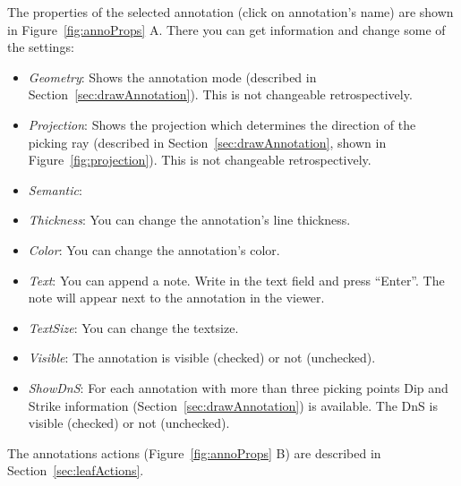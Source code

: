 The properties of the selected annotation (click on annotation's name) are shown in Figure~\ref{fig:annoProps} A. There you can get information and change some of the settings:
\begin{itemize}
	\item \textit{Geometry}: Shows the annotation mode (described in Section~\ref{sec:drawAnnotation}). This is not changeable retrospectively.
	\item \textit{Projection}: Shows the projection which determines the direction of the picking ray (described in Section~\ref{sec:drawAnnotation}, shown in Figure~\ref{fig:projection}). This is not changeable retrospectively.
	\item \textit{Semantic}: 
	\item \textit{Thickness}: You can change the annotation's line thickness.
	\item \textit{Color}: You can change the annotation's color.
	\item \textit{Text}: You can append a note. Write in the text field and press ``Enter''. The note will appear next to the annotation in the viewer. 
	\item \textit{TextSize}: You can change the textsize.
	\item \textit{Visible}: The annotation is visible (checked) or not (unchecked).
	\item \textit{ShowDnS}: For each annotation with more than three picking points Dip and Strike information (Section~\ref{sec:drawAnnotation}) is available. The DnS is visible (checked) or not (unchecked).
\end{itemize}

The annotations actions (Figure~\ref{fig:annoProps} B) are described in Section~\ref{sec:leafActions}.\\

